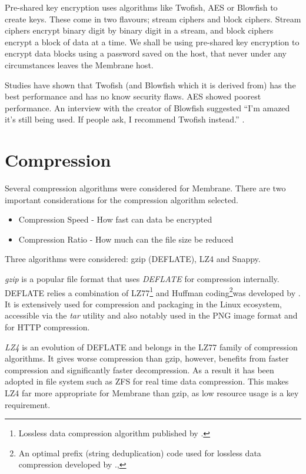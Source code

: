 \documentclass[11pt, a4paper, twocolumn, twoside]{report}
\begin{document}
Pre-shared key encryption uses algorithms like Twofish, AES or Blowfish to create keys. These come in two flavours; stream ciphers and block ciphers. Stream ciphers encrypt binary digit by binary digit in a stream, and block ciphers encrypt a block of data at a time. We shall be using pre-shared key encryption to encrypt data blocks using a password saved on the host, that never under any circumstances leaves the Membrane host.

Studies have shown that Twofish (and Blowfish which it is derived from) has the best performance and has no know security flaws. AES showed poorest performance. \citep*{thakur2011aes, rizvi2011performance, mushtaque2014evaluation} An interview with the creator of Blowfish suggested ``I'm amazed it's still being used. If people ask, I recommend Twofish instead.'' \cite{fish2007bruce}.

\section{Compression} \label{sec:compression}

Several compression algorithms were considered for Membrane. There are two important considerations for the compression algorithm selected.

\begin{itemize}
 \item Compression Speed - How fast can data be encrypted
 \item Compression Ratio - How much can the file size be reduced
\end{itemize}

Three algorithms were considered: gzip (DEFLATE), LZ4 and Snappy.

\emph{gzip} is a popular file format that uses \emph{DEFLATE} for compression internally. DEFLATE relies a combination of LZ77\footnote{Lossless data compression algorithm published by \cite{ziv1977universal}.} and Huffman coding\footnote{An optimal prefix (string deduplication) code used for lossless data compression developed by \cite{huffman1952method}., }was developed by \cite{deutsch1996deflate}. It is extensively used for compression and packaging in the Linux ecosystem, accessible via the \emph{tar} utility and also notably used in the PNG image format and for HTTP compression.

\emph{LZ4} is an evolution of DEFLATE and belongs in the LZ77 family of compression algorithms. It gives worse compression than gzip, however, benefits from faster compression and significantly faster decompression. \citep{legesse2014performance} As a result it has been adopted in file system such as ZFS for real time data compression. This makes LZ4 far more appropriate for Membrane than gzip, as low resource usage is a key requirement.
\end{document}
